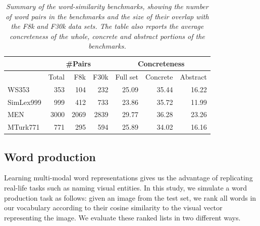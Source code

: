 \begin{table}[h]
\tabcolsep=0.11cm
\centering
\begin{tabular}{@{}lrrr||rrr@{}}
\hline
 & \multicolumn{3}{c}{\#Pairs} &  \multicolumn{3}{c}{Concreteness} \\
\hline
\hline
               & Total & F8k & F30k  & Full set & Concrete & Abstract \\ \hline
 WS353   & 353   & 104              & 232               & 25.09        & 35.44 & 16.22 \\
 SimLex999   & 999   & 412              & 733               & 23.86        & 35.72 & 11.99 \\
 MEN          & 3000  & 2069             & 2839              & 29.77        & 36.28 & 23.26 \\
 MTurk771    & 771   & 295              & 594               & 25.89        & 34.02 & 16.16 \\
\hline
\end{tabular}
\caption{\textit{Summary of the word-similarity benchmarks, showing the number of
word pairs in the benchmarks and the size of their overlap with the F8k
and F30k data sets. The table also reports the average concreteness of
the whole, concrete and abstract portions of the benchmarks.}}
\label{tab:benchmarks}
\end{table}

\subsection{Word production}
\label{sec:experiments-production}
Learning multi-modal word representations gives us the advantage of
replicating real-life tasks such as naming visual entities. In this
study, we simulate a word production task as follows: given an image
from the test set, we rank all words in our vocabulary according to
their cosine similarity to the visual vector representing the
image. We evaluate these ranked lists in two different ways.

